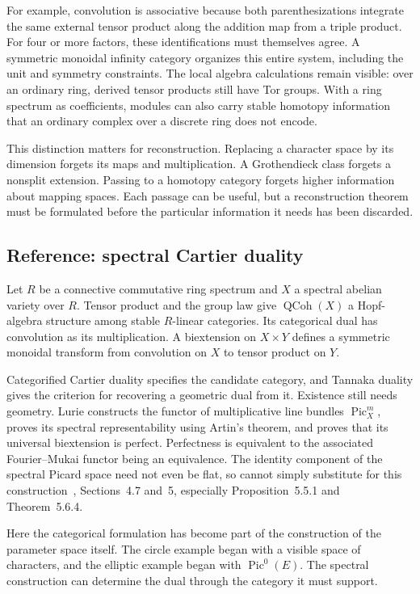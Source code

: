 \documentclass[11pt]{article}
\theoremstyle{remark}
\begin{document}
For example, convolution is associative because both parenthesizations integrate the same external tensor product along the addition map from a triple product. For four or more factors, these identifications must themselves agree. A symmetric monoidal infinity category organizes this entire system, including the unit and symmetry constraints. The local algebra calculations remain visible: over an ordinary ring, derived tensor products still have Tor groups. With a ring spectrum as coefficients, modules can also carry stable homotopy information that an ordinary complex over a discrete ring does not encode.

This distinction matters for reconstruction. Replacing a character space by its dimension forgets its maps and multiplication. A Grothendieck class forgets a nonsplit extension. Passing to a homotopy category forgets higher information about mapping spaces. Each passage can be useful, but a reconstruction theorem must be formulated before the particular information it needs has been discarded.

\subsection{Reference: spectral Cartier duality}

Let \(R\) be a connective commutative ring spectrum and \(X\) a spectral abelian variety over \(R\). Tensor product and the group law give \(\operatorname{QCoh}(X)\) a Hopf-algebra structure among stable \(R\)-linear categories. Its categorical dual has convolution as its multiplication. A biextension on \(X\times Y\) defines a symmetric monoidal transform from convolution on \(X\) to tensor product on \(Y\).

Categorified Cartier duality specifies the candidate category, and Tannaka duality gives the criterion for recovering a geometric dual from it. Existence still needs geometry. Lurie constructs the functor of multiplicative line bundles \(\operatorname{Pic}^m_X\), proves its spectral representability using Artin's theorem, and proves that its universal biextension is perfect. Perfectness is equivalent to the associated Fourier--Mukai functor being an equivalence. The identity component of the spectral Picard space need not even be flat, so cannot simply substitute for this construction~\cite{lurie-elliptic}, Sections~4.7 and~5, especially Proposition~5.5.1 and Theorem~5.6.4.

Here the categorical formulation has become part of the construction of the parameter space itself. The circle example began with a visible space of characters, and the elliptic example began with \(\operatorname{Pic}^0(E)\). The spectral construction can determine the dual through the category it must support.
\end{document}
